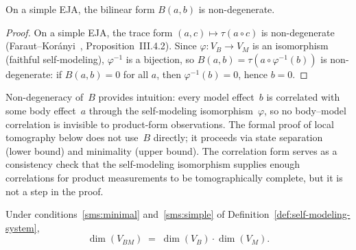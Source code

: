\begin{proposition}\label{prop:nondeg}
On a simple EJA, the bilinear form $B(a,b)$ is non-degenerate.
\end{proposition}

\begin{proof}
On a simple EJA, the trace form $(a,c) \mapsto \tau(a\circ c)$ is
non-degenerate (Faraut--Kor\'anyi~\cite{FarautKoranyi1994},
Proposition~III.4.2). Since $\varphi\colon V_B\to V_M$ is an
isomorphism (faithful self-modeling), $\varphi^{-1}$ is a bijection,
so $B(a,b) = \tau(a\circ\varphi^{-1}(b))$ is non-degenerate: if
$B(a,b) = 0$ for all $a$, then $\varphi^{-1}(b) = 0$, hence $b=0$.
\end{proof}

\begin{remark}\label{rem:corr-role}
Non-degeneracy of~$B$ provides intuition: every model effect~$b$ is
correlated with some body effect~$a$ through the self-modeling
isomorphism~$\varphi$, so no body--model correlation is invisible to
product-form observations.  The formal proof of local tomography
below does not use~$B$ directly; it proceeds via state separation
(lower bound) and minimality (upper bound).  The correlation form
serves as a consistency check that the self-modeling isomorphism
supplies enough correlations for product measurements to be
tomographically complete, but it is not a step in the proof.
\end{remark}

\begin{theorem}\label{thm:local-tomo}
Under conditions~\ref{sms:minimal} and~\ref{sms:simple} of
Definition~\ref{def:self-modeling-system},
\[
  \dim(V_{BM}) \;=\; \dim(V_B)\cdot\dim(V_M).
\]
\end{theorem}

